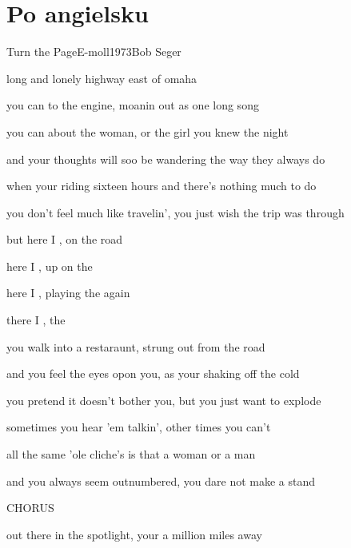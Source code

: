 \documentclass[a4paper,draft]{book}
\begin{document}
\chapter{Po angielsku}
\begin{song}{Turn the Page}{E-moll}{1973}{Bob Seger}{}{}

	\begin{SBVerse}
	 long and lonely highway east of omaha

	you can  to the engine, moanin out as one long song

	you can  about the woman, or the girl you knew the night 
	\end{SBVerse}
	\begin{SBVerse}
	and your thoughts will soo be wandering the way they always do

	when your riding sixteen hours and there's nothing much to do

	you don't feel much like travelin', you just wish the trip was through
	\end{SBVerse}
	\begin{SBChorus}
	but here I , on the road \Ch{Em}{again}

	here I , up on the \Ch{Em}{stage}

	here I , playing the  again

	there I ,  the \Ch{Em}{page}
	\end{SBChorus}
	\begin{SBVerse}
	you walk into a restaraunt, strung out from the road

	and you feel the eyes opon you, as your shaking off the cold

	you pretend it doesn't bother you, but you just want to explode
	\end{SBVerse}
	\begin{SBVerse}
	sometimes you hear 'em talkin', other times you can't

	all the same 'ole cliche's is that a woman or a man

	and you always seem outnumbered, you dare not make a stand
	\end{SBVerse}
	\begin{SBChorus}
	CHORUS
	\end{SBChorus}
	\begin{SBVerse}
	out there in the spotlight, your a million miles away


\end{SBVerse}
\end{song}
\end{document}

